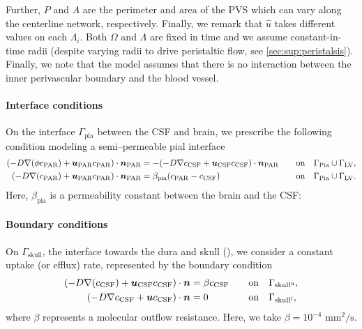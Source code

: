 Further, $P$ and $A$ are the perimeter and area of the PVS which can vary along the centerline network, respectively.  Finally, we remark that $\hat u$ takes different values on each $\Lambda_i$.  Both $\Omega$ and $\Lambda$ are fixed in time and we assume constant-in- time radii (despite varying radii to drive peristaltic flow, see \cref{sec:sup:peristalsis}). Finally, we note that the model assumes that there is no interaction between the inner perivascular boundary and the blood vessel. 


\paragraph*{Interface conditions}
On the interface $\Gamma_{\mathrm{pia}}$ between the CSF and brain, we prescribe the following condition modeling a semi--permeable pial interface 
\begin{alignat}{2}
(-D \nabla (\phi c_{\rm{PAR}}) + \bm u_{\rm{PAR}} c_{\rm{PAR} }) \cdot \bm{n}_{\rm{PAR}} &= - (- D \nabla c_{\rm{CSF}} + \bm u_{\rm{CSF}} c_{\rm{CSF}} ) \cdot \bm{n}_{\rm{PAR}} &&  \quad  \mathrm{on} \quad \Gamma_{\rm{Pia}} \cup \Gamma_{\mathrm{LV}} ,  \\  
(-D \nabla ( c_{\rm{PAR}}) + \bm u_{\rm{PAR}} c_{\rm{PAR} }) \cdot \bm{n}_{\rm{PAR}} & = \beta_{\rm{pia}} (c_{\rm PAR} - c_{\mathrm{CSF}}) &&  \quad  \mathrm{on} \quad  \Gamma_{\rm{Pia}} \cup \Gamma_{\mathrm{LV}} .  
\end{alignat} 
Here, $\beta_{\mathrm{pia}}$ is a permeability constant between the brain and the CSF:

\paragraph*{Boundary conditions}
On $\Gamma_{\mathrm{skull}}$, the interface towards the dura and skull (), we consider a constant uptake (or efflux) rate, represented by the boundary condition 
\begin{alignat}{2}
(- D \nabla ( c_{\mathrm{CSF}}) + \bm u_{\mathrm{CSF}} c_{\mathrm{CSF}}) \cdot \bm{n}   & = \beta c_{\mathrm{CSF}}  && \quad \mathrm{on} \quad \Gamma_{\mathrm{skull}^{\rm u}},\\ 
(-D \nabla c_{\rm CSF} + \bm u c_{\rm CSF}) \cdot \bm{n} & =  0   &&  \quad  \mathrm{on} \quad \Gamma_{\rm skull^{l}} , 
\end{alignat}
where $\beta$ represents a molecular outflow resistance. Here, we take $\beta = 10^{-4} \,\, \mathrm{mm}^2/\mathrm{s}$\cite{hornkjol2022csf}.


